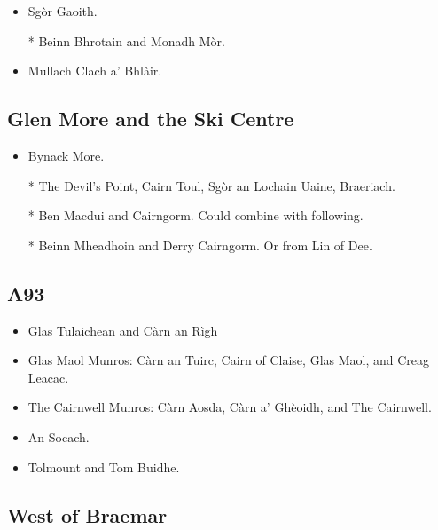 \begin{itemize}
\item Sgòr Gaoith.

\item[*] Beinn Bhrotain and Monadh Mòr.

\item Mullach Clach a' Bhlàir.
\end{itemize}


\subsection{Glen More and the Ski Centre}

\begin{itemize}
\item Bynack More.

\item[*] The Devil's Point, Cairn Toul, Sgòr an Lochain Uaine, Braeriach.

\item[*] Ben Macdui and Cairngorm.  Could combine with following. 

\item[*] Beinn Mheadhoin and Derry Cairngorm.  Or from Lin of Dee.
\end{itemize}


\subsection{A93}

\begin{itemize}
\item Glas Tulaichean and Càrn an Rìgh

\item
Glas Maol Munros: Càrn an Tuirc, Cairn of Claise, Glas Maol, and Creag Leacac.

\item The Cairnwell Munros: Càrn Aosda, Càrn a' Ghèoidh, and The Cairnwell.

\item An Socach.

\item Tolmount and Tom Buidhe.
\end{itemize}


\subsection{West of Braemar}

